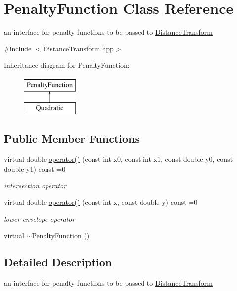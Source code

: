 \hypertarget{classPenaltyFunction}{\section{\-Penalty\-Function \-Class \-Reference}
\label{classPenaltyFunction}
}


an interface for penalty functions to be passed to \hyperlink{classDistanceTransform}{\-Distance\-Transform}  




{\ttfamily \#include $<$\-Distance\-Transform.\-hpp$>$}

\-Inheritance diagram for \-Penalty\-Function\-:\begin{figure}[H]
\begin{center}
\leavevmode
\includegraphics[height=2.000000cm]{classPenaltyFunction}
\end{center}
\end{figure}
\subsection*{\-Public \-Member \-Functions}
\begin{DoxyCompactItemize}
\item 
virtual double \hyperlink{classPenaltyFunction_a944230ce310515b1fe10972388c00042}{operator()} (const int x0, const int x1, const double y0, const double y1) const =0
\begin{DoxyCompactList}\small\item\em intersection operator \end{DoxyCompactList}\item 
virtual double \hyperlink{classPenaltyFunction_ad1f2cdbcfc85d0eaf3b734cafce60c48}{operator()} (const int x, const double y) const =0
\begin{DoxyCompactList}\small\item\em lower-\/envelope operator \end{DoxyCompactList}\item 
virtual \hyperlink{classPenaltyFunction_ac97741baf27aa9e506f430338f460498}{$\sim$\-Penalty\-Function} ()
\end{DoxyCompactItemize}


\subsection{\-Detailed \-Description}
an interface for penalty functions to be passed to \hyperlink{classDistanceTransform}{\-Distance\-Transform} 

